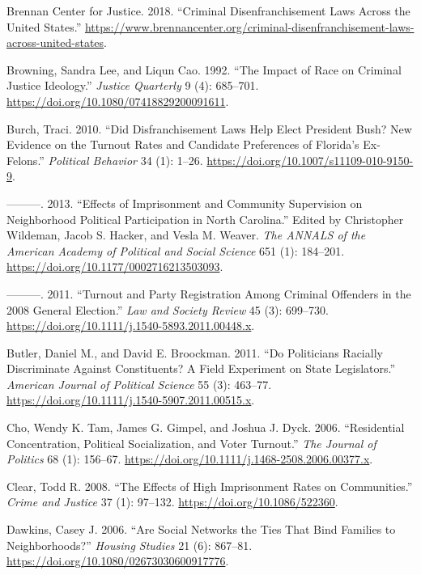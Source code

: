 \documentclass[
  12pt,
]{article}
\newlength{\cslhangindent}
\newenvironment{cslreferences}%
  {\setlength{\parindent}{0pt}%
  \everypar{\setlength{\hangindent}{\cslhangindent}}\ignorespaces}%
  {\par}
\begin{document}
\begin{cslreferences}
\leavevmode\hypertarget{ref-bcj_laws}{}%
Brennan Center for Justice. 2018. ``Criminal Disenfranchisement Laws Across the United States.'' \url{https://www.brennancenter.org/criminal-disenfranchisement-laws-across-united-states}.

\leavevmode\hypertarget{ref-Browning1992}{}%
Browning, Sandra Lee, and Liqun Cao. 1992. ``The Impact of Race on Criminal Justice Ideology.'' \emph{Justice Quarterly} 9 (4): 685--701. \url{https://doi.org/10.1080/07418829200091611}.

\leavevmode\hypertarget{ref-Burch2010}{}%
Burch, Traci. 2010. ``Did Disfranchisement Laws Help Elect President Bush? New Evidence on the Turnout Rates and Candidate Preferences of Florida's Ex-Felons.'' \emph{Political Behavior} 34 (1): 1--26. \url{https://doi.org/10.1007/s11109-010-9150-9}.

\leavevmode\hypertarget{ref-Burch2013}{}%
---------. 2013. ``Effects of Imprisonment and Community Supervision on Neighborhood Political Participation in North Carolina.'' Edited by Christopher Wildeman, Jacob S. Hacker, and Vesla M. Weaver. \emph{The ANNALS of the American Academy of Political and Social Science} 651 (1): 184--201. \url{https://doi.org/10.1177/0002716213503093}.

\leavevmode\hypertarget{ref-Burch2011}{}%
---------. 2011. ``Turnout and Party Registration Among Criminal Offenders in the 2008 General Election.'' \emph{Law and Society Review} 45 (3): 699--730. \url{https://doi.org/10.1111/j.1540-5893.2011.00448.x}.

\leavevmode\hypertarget{ref-Butler2011}{}%
Butler, Daniel M., and David E. Broockman. 2011. ``Do Politicians Racially Discriminate Against Constituents? A Field Experiment on State Legislators.'' \emph{American Journal of Political Science} 55 (3): 463--77. \url{https://doi.org/10.1111/j.1540-5907.2011.00515.x}.

\leavevmode\hypertarget{ref-Cho2006}{}%
Cho, Wendy K. Tam, James G. Gimpel, and Joshua J. Dyck. 2006. ``Residential Concentration, Political Socialization, and Voter Turnout.'' \emph{The Journal of Politics} 68 (1): 156--67. \url{https://doi.org/10.1111/j.1468-2508.2006.00377.x}.

\leavevmode\hypertarget{ref-Clear2008}{}%
Clear, Todd R. 2008. ``The Effects of High Imprisonment Rates on Communities.'' \emph{Crime and Justice} 37 (1): 97--132. \url{https://doi.org/10.1086/522360}.

\leavevmode\hypertarget{ref-Dawkins2006}{}%
Dawkins, Casey J. 2006. ``Are Social Networks the Ties That Bind Families to Neighborhoods?'' \emph{Housing Studies} 21 (6): 867--81. \url{https://doi.org/10.1080/02673030600917776}.


\end{cslreferences}
\end{document}
